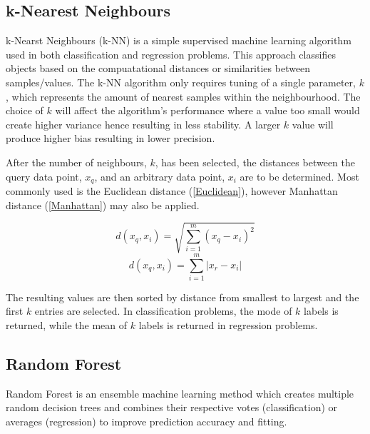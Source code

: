 \documentclass[a4paper,12pt]{report}
\begin{document}


\subsection{k-Nearest Neighbours}
k-Nearst Neighbours (k-NN) is a simple supervised machine learning algorithm used in both classification and regression problems. 
This approach classifies objects based on the compuatational distances or similarities between samples/values.
The k-NN algorithm only requires tuning of a single parameter, $k$, which represents the amount of nearest samples within the neighbourhood.
The choice of $k$ will affect the algorithm's performance where a value too small would create higher variance hence resulting in less stability.
A larger $k$ value will produce higher bias resulting in lower precision. 

After the number of neighbours, $k$, has been selected, the distances between the query data point, $x_q$, and an arbitrary data point, $x_i$ are to be determined.
Most commonly used is the Euclidean distance (\ref{Euclidean}), however Manhattan distance (\ref{Manhattan}) may also be applied.

\begin{equation} \label{Euclidean}
    d(x_q,x_i) = \sqrt{\sum_{i=1}^{m} (x_q - x_i)^2}
\end{equation}
\begin{equation} \label{Manhattan}
    d(x_q,x_i) = \sum_{i=1}^{m} \lvert x_r - x_i \rvert
\end{equation}

The resulting values are then sorted by distance from smallest to largest and the first $k$ entries are selected. 
In classification problems, the mode of $k$ labels is returned, while the mean of $k$ labels is returned in regression problems.


\subsection{Random Forest}
Random Forest is an ensemble machine learning method which creates multiple random decision trees and combines their respective votes (classification) or averages (regression) to improve prediction accuracy and fitting.
\end{document}
